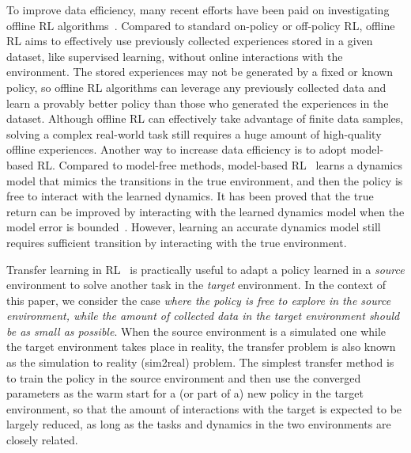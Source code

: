 \documentclass[letterpaper]{article} %
\begin{document}
To improve data efficiency, many recent efforts have been paid on investigating offline RL algorithms~\citep{rosete2023latent,zhan2022offline, lyu2022mildly,siegel2020keep,fujimoto2019off}. Compared to standard on-policy or off-policy RL, offline RL aims to effectively use previously collected experiences stored in a given dataset, like supervised learning, without online interactions with the environment. The stored experiences may not be generated by a fixed or known policy, so offline RL algorithms can leverage any previously collected data and learn a provably better policy than those who generated the experiences in the dataset.
Although offline RL can effectively take advantage of finite data samples, solving a complex real-world task still requires a huge amount of high-quality offline experiences. Another way to increase data efficiency is to adopt model-based RL. Compared to model-free methods, model-based RL~\citep{bakker2001reinforcement,schaefer2007recurrent,kaiser2019model,janner2019trust,delecki2023model} learns a dynamics model that mimics the transitions in the true environment, and then the policy is free to interact with the learned dynamics. It has been proved that the true return can be improved by interacting with the learned dynamics model when the model error is bounded~\citep{janner2019trust}. However, learning an accurate dynamics model still requires sufficient transition by interacting with the true environment.

Transfer learning in RL~\citep{taylor2009transfer,zhu2023transfer} is practically useful to adapt a policy learned in a \emph{source} environment to solve another task in the \emph{target} environment. In the context of this paper, we consider the case \emph{where the policy is free to explore in the source environment, while the amount of collected data in the target environment should be as small as possible}. When the source environment is a simulated one while the target environment takes place in reality, the transfer problem is also known as the simulation to reality (sim2real) problem. The simplest transfer method is to train the policy in the source environment and then use the converged parameters as the warm start for a (or part of a) new policy in the target environment, so that the amount of interactions with the target is expected to be largely reduced, as long as the tasks and dynamics in the two environments are closely related.
\end{document}
